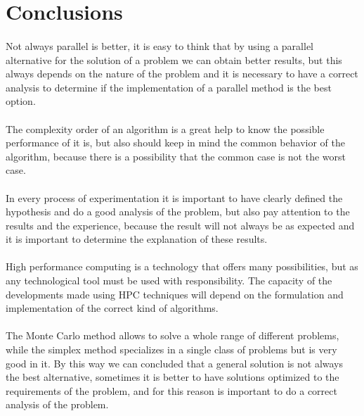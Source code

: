 \documentclass[runningheads]{llncs}
\begin{document}
\section{Conclusions}

\paragraph{}
Not always parallel is better, it is easy to think that by using a parallel alternative for the solution of a problem we can obtain better results, but this always depends on the nature of the problem and it is necessary to have a correct analysis to determine if the implementation of a parallel method is the best option.

\paragraph{}
The complexity order of an algorithm is a great help to know the possible performance of it is, but also should keep in mind the common behavior of the algorithm, because there is a possibility that the common case is not the worst case.

\paragraph{}
In every process of experimentation it is important to have clearly defined the hypothesis and do a good analysis of the problem, but also pay attention to the results and the experience, because the result will not always be as expected and it is important to determine the explanation of these results.

\paragraph{}
High performance computing is a technology that offers many possibilities, but as any technological tool must be used with responsibility. The capacity of the developments made using HPC techniques will depend on the formulation and implementation of the correct kind of algorithms. 

\paragraph{}
The Monte Carlo method allows to solve a whole range of different problems, while the simplex method specializes in a single class of problems but is very good in it. By this way we can concluded that a general solution is not always the best alternative, sometimes it is better to have solutions optimized to the requirements of the problem, and for this reason is important to do a correct analysis of the problem.
\end{document}
